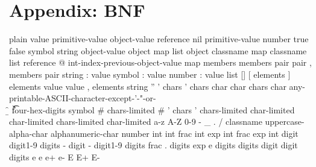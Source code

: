 \documentclass[10pt,twoside,english]{_support/latex/sbabook/sbabook}
\begin{document}
\chapter{Appendix: BNF}
\begin{displaycode}{plain}
value
   primitive-value
   object-value
   reference
   nil
primitive-value
   number
   true
   false
   symbol
   string
object-value
   object
   map
   list
object
   classname map
   classname list
reference
   @ int-index-previous-object-value
map
   {}
   { members }
members
   pair
   pair , members
pair
   string : value
   symbol : value
   number : value
list
   []
   [ elements ]
elements
   value
   value , elements
string
   ''
   ' chars '
chars
   char
   char chars
char
   any-printable-ASCII-character-except-'-"-or-\
   \'
   \"
   \\
   \/
   \b
   \f
   \n
   \r
   \t
   \u four-hex-digits
symbol
   # chars-limited
   # ' chars '
chars-limited
   char-limited
   char-limited chars-limited
char-limited
   a-z A-Z 0-9 - _ . /
classname
   uppercase-alpha-char alphanumeric-char
number
   int
   int frac
   int exp
   int frac exp
int
   digit
   digit1-9 digits
   - digit
   - digit1-9 digits
frac
   . digits
exp
   e digits
digits
   digit
   digit digits
e
   e
   e+
   e-
   E
   E+
   E-
\end{displaycode}






\backmatter

\end{document}
